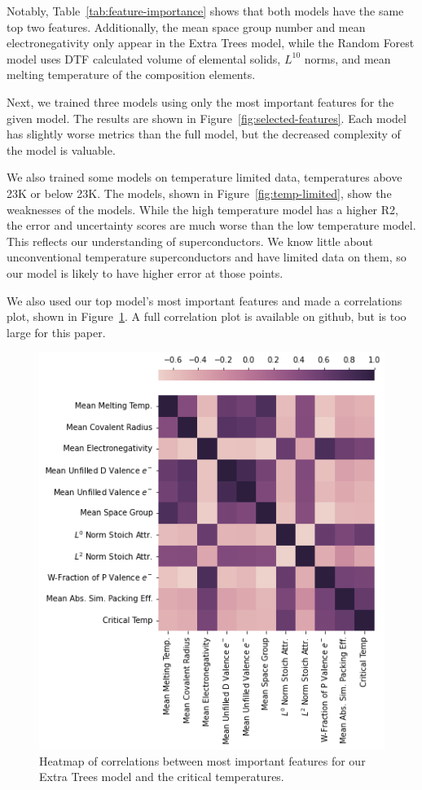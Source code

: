 \documentclass[twocolumn, nofootinbib, secnumarabic, amssymb, nobibnotes, aps, prd]{revtex4-2}
\begin{document}
Notably, Table~\ref{tab:feature-importance} shows that both models have the same top two features. Additionally, the mean space group number and mean electronegativity only appear in the Extra Trees model, while the Random Forest model uses DTF calculated volume of elemental solids, $L^{10}$ norms, and mean melting temperature of the composition elements.

Next, we trained three models using only the most important features for the given model. The results are shown in Figure~\ref{fig:selected-features}. Each model has slightly worse metrics than the full model, but the decreased complexity of the model is valuable.

We also trained some models on temperature limited data, temperatures above 23K or below 23K. The models, shown in Figure~\ref{fig:temp-limited}, show the weaknesses of the models. While the high temperature model has a higher R2, the error and uncertainty scores are much worse than the low temperature model. This reflects our understanding of superconductors. We know little about unconventional temperature superconductors and have limited data on them, so our model is likely to have higher error at those points.

We also used our top model's most important features and made a correlations plot, shown in Figure~\ref{fig:feature-correlations}. A full correlation plot is available on github, but is too large for this paper.


\begin{figure}[!h]
   \centering
   \includegraphics[width=\columnwidth]{images/feature_heatmap_eti.png}
   \caption{Heatmap of correlations between most important features for our Extra Trees model and the critical temperatures.}
   \label{fig:feature-correlations}
\end{figure}%
\end{document}
